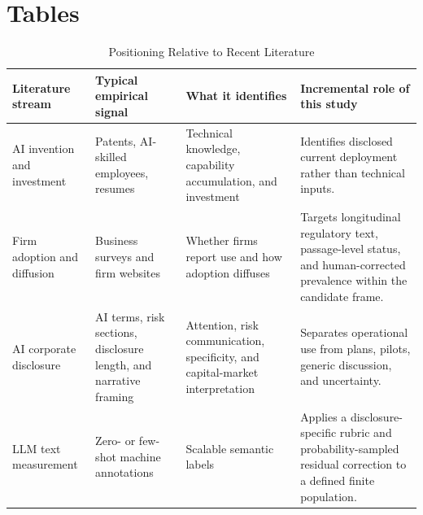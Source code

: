 \documentclass[12pt]{article}
\begin{document}
\clearpage



\clearpage
\section*{Tables}

\begin{table}[htbp]
\centering
\caption{Positioning Relative to Recent Literature}
\label{tab:positioning}
\small
\begin{tabularx}{\textwidth}{@{}p{}p{}
  p{}X@{}}
\toprule
Literature stream & Typical empirical signal & What it identifies &
Incremental role of this study \\
\midrule
AI invention and investment &
Patents, AI-skilled employees, resumes &
Technical knowledge, capability accumulation, and investment &
Identifies disclosed current deployment rather than technical inputs. \\
\addlinespace
Firm adoption and diffusion &
Business surveys and firm websites &
Whether firms report use and how adoption diffuses &
Targets longitudinal regulatory text, passage-level status, and
human-corrected prevalence within the candidate frame. \\
\addlinespace
AI corporate disclosure &
AI terms, risk sections, disclosure length, and narrative framing &
Attention, risk communication, specificity, and capital-market interpretation &
Separates operational use from plans, pilots, generic discussion, and
uncertainty. \\
\addlinespace
LLM text measurement &
Zero- or few-shot machine annotations &
Scalable semantic labels &
Applies a disclosure-specific rubric and probability-sampled residual
correction to a defined finite population. \\
\bottomrule
\end{tabularx}
\end{table}
\end{document}
